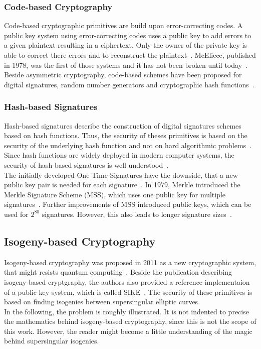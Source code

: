 \subsubsection{Code-based Cryptography}
Code-based cryptographic primitives are build upon error-correcting codes. A public key system using error-correcting codes uses a public key to add errors to a given plaintext resulting in a ciphertext. Only the owner of the private key is able to correct there errors and to reconstruct the plaintext~\parencite{bernstein2017post}. McEliece, published in 1978, was the first of those systems and it has not been broken until today~\parencite{mceliece1978public}.
Beside asymmetric cryptography, code-based schemes have been proposed for digital signatures, random number generators and cryptographic hash functions~\parencite{bernstein2017post}.
\subsubsection{Hash-based Signatures}
Hash-based signatures describe the construction of digital signatures schemes based on hash functions. Thus, the security of theses primitives is based on the security of the underlying hash function and not on hard algorithmic problems~\parencite{bernstein2017post}. Since hash functions are widely deployed in modern computer systems, the security of hash-based signatures is well understood~\parencite{chen2016report}.\\
The initially developed One-Time Signatures have the downside, that a new public key pair is needed for each signature~\parencite{becker2008merkle}. In 1979, Merkle introduced the Merkle Signature Scheme (MSS), which uses one public key for multiple signatures~\parencite{merkle1979secrecy}. Further improvements of MSS introduced public keys, which can be used for $2^{80}$ signatures. However, this also leads to longer signature sizes~\parencite{becker2008merkle}.

\subsection{Isogeny-based Cryptography} \label{isogeny-based_crypto}
Isogeny-based cryptography was proposed in 2011 as a new cryptographic system, that might resists quantum computing~\parencite{jao2011towards}. Beside the publication describing isogeny-based cryptgraphy, the authors also provided a reference implementaion of a public key system, which is called SIKE~\parencite{sike2020spec}. The security of these primitives is based on finding isogenies between supersingular elliptic curves.\\
In the following, the problem is roughly illustrated. It is not indented to precise the mathematics behind isogeny-based cryptography, since this is not the scope of this work. However, the reader might become a little understanding of the magic behind supersingular isogenies.

